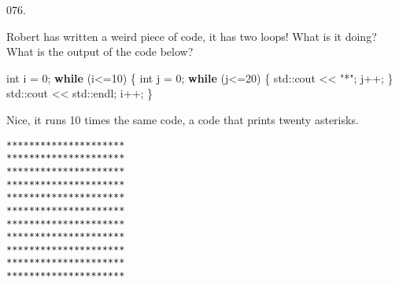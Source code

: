 \documentclass[]{book}
\newenvironment{Shaded}{}{}
\newcommand{\BuiltInTok}[1]{#1}
\newcommand{\ControlFlowTok}[1]{\textcolor[rgb]{0.00,0.44,0.13}{\textbf{#1}}}
\newcommand{\DataTypeTok}[1]{\textcolor[rgb]{0.56,0.13,0.00}{#1}}
\newcommand{\DecValTok}[1]{\textcolor[rgb]{0.25,0.63,0.44}{#1}}
\newcommand{\NormalTok}[1]{#1}
\newcommand{\StringTok}[1]{\textcolor[rgb]{0.25,0.44,0.63}{#1}}
\begin{document}
\begin{minipage}{\linewidth}\noindent
{\tiny 076.}\\
\begin{minipage}[t]{.485\linewidth}

Robert has written a weird piece of code, it has two loops! What is it
doing? What is the output of the code below?

\begin{framed}

\begin{Shaded}
\begin{Highlighting}[]
\DataTypeTok{int}\NormalTok{ i = }\DecValTok{0}\NormalTok{;}
\ControlFlowTok{while}\NormalTok{ (i<=}\DecValTok{10}\NormalTok{) \{}
  \DataTypeTok{int}\NormalTok{ j = }\DecValTok{0}\NormalTok{;}
  \ControlFlowTok{while}\NormalTok{ (j<=}\DecValTok{20}\NormalTok{) \{}
    \BuiltInTok{std::}\NormalTok{cout << }\StringTok{"*"}\NormalTok{;}
\NormalTok{    j++;}
\NormalTok{  \}}
  \BuiltInTok{std::}\NormalTok{cout << }\BuiltInTok{std::}\NormalTok{endl;}
\NormalTok{  i++;}
\NormalTok{\}}
\end{Highlighting}
\end{Shaded}

\end{framed}

\end{minipage}
\hfill
\begin{minipage}[t]{.485\linewidth}

Nice, it runs 10 times the same code, a code that prints twenty
asterisks.

\begin{framed}

\begin{verbatim}
*********************
*********************
*********************
*********************
*********************
*********************
*********************
*********************
*********************
*********************
*********************
\end{verbatim}

\end{framed}

\end{minipage}
\end{minipage}

\vspace{2mm}\noindent\hrulefill{}
\end{document}
